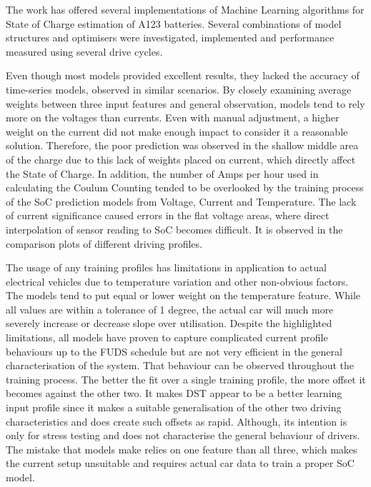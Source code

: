 The work has offered several implementations of Machine Learning algorithms for State of Charge estimation of A123 batteries.
Several combinations of model structures and optimisers were investigated, implemented and performance measured using several drive cycles.

%
%
Even though most models provided excellent results, they lacked the accuracy of time-series models, observed in similar scenarios.
By closely examining average weights between three input features and general observation, models tend to rely more on the voltages than currents.
Even with manual adjustment, a higher weight on the current did not make enough impact to consider it a reasonable solution. 
Therefore, the poor prediction was observed in the shallow middle area of the charge due to this lack of weights placed on current, which directly affect the State of Charge.
In addition, the number of Amps per hour used in calculating the Coulum Counting tended to be overlooked by the training process of the SoC prediction models from Voltage, Current and Temperature.
The lack of current significance caused errors in the flat voltage areas, where direct interpolation of sensor reading to SoC becomes difficult.
It is observed in the comparison plots of different driving profiles. 

%
%
The usage of any training profiles has limitations in application to actual electrical vehicles due to temperature variation and other non-obvious factors.
The models tend to put equal or lower weight on the temperature feature.
While all values are within a tolerance of 1 degree, the actual car will much more severely increase or decrease slope over utilisation.
Despite the highlighted limitations, all models have proven to capture complicated current profile behaviours up to the FUDS schedule but are not very efficient in the general characterisation of the system.
That behaviour can be observed throughout the training process.
The better the fit over a single training profile, the more offset it becomes against the other two.
It makes DST appear to be a better learning input profile since it makes a suitable generalisation of the other two driving characteristics and does create such offsets as rapid.
Although, its intention is only for stress testing and does not characterise the general behaviour of drivers.
The mistake that models make relies on one feature than all three, which makes the current setup unsuitable and requires actual car data to train a proper SoC model.

